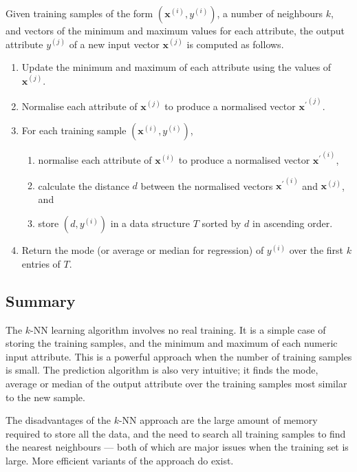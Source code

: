 Given training samples of the form \( \left( \boldsymbol{x}^{(i)}, y^{(i)} \right) \), a number of neighbours \( k \), and vectors of the minimum and maximum values for each attribute, the output attribute \( y^{(j)} \) of a new input vector \( \boldsymbol{x}^{(j)} \) is computed as follows.
\begin{enumerate}
  \item Update the minimum and maximum of each attribute using the values of \( \boldsymbol{x}^{(j)} \).
  \item Normalise each attribute of \( \boldsymbol{x}^{(j)} \) to produce a normalised vector \( {\boldsymbol{x}^{\prime}}^{(j)} \).
  \item For each training sample \( \left( \boldsymbol{x}^{(i)}, y^{(i)} \right) \),
  \begin{enumerate}
    \item normalise each attribute of \( \boldsymbol{x}^{(i)} \) to produce a normalised vector \( {\boldsymbol{x}^{\prime}}^{(i)} \),
    \item calculate the distance \( d \) between the normalised vectors \( {\boldsymbol{x}^{\prime}}^{(i)} \) and \( \boldsymbol{x}^{(j)} \), and
    \item store \( \left( d, y^{(i)} \right) \) in a data structure \( T \) sorted by \( d \) in ascending order.
  \end{enumerate}
  \item Return the mode (or average or median for regression) of \( y^{(i)} \) over the first \( k \) entries of \( T \)\@.
\end{enumerate}

\subsection{Summary}

The \( k \)-NN learning algorithm involves no real training.
It is a simple case of storing the training samples, and the minimum and maximum of each numeric input attribute.
This is a powerful approach when the number of training samples is small.
The prediction algorithm is also very intuitive; it finds the mode, average or median of the output attribute over the training samples most similar to the new sample.

The disadvantages of the \( k \)-NN approach are the large amount of memory required to store all the data, and the need to search all training samples to find the nearest neighbours --- both of which are major issues when the training set is large.
More efficient variants of the approach do exist.
